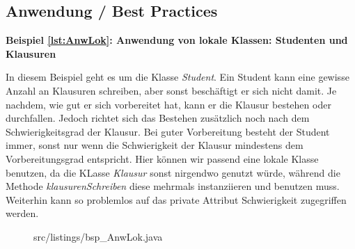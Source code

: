 \subsection{Anwendung / Best Practices}

{\bf Beispiel \ref{lst:AnwLok}: Anwendung von lokale Klassen: Studenten und Klausuren}

In diesem Beispiel geht es um die Klasse {\it Student}.
Ein Student kann eine gewisse Anzahl an Klausuren schreiben, aber sonst beschäftigt er sich nicht damit.
Je nachdem, wie gut er sich vorbereitet hat, kann er die Klausur bestehen oder durchfallen.
Jedoch richtet sich das Bestehen zusätzlich noch nach dem Schwierigkeitsgrad der Klausur.
Bei guter Vorbereitung besteht der Student immer, sonst nur wenn die  Schwierigkeit der Klausur mindestens dem Vorbereitungsgrad entspricht.
Hier können wir passend eine lokale Klasse benutzen, da die KLasse {\it Klausur} sonst nirgendwo genutzt würde, während die Methode {\it klausurenSchreiben} diese mehrmals instanziieren und benutzen muss.
Weiterhin kann so problemlos auf das private Attribut Schwierigkeit zugegriffen werden.
\\
\newpage
\begin{figure}[H]
\lstset{language=Java}
 {src/listings/bsp_AnwLok.java}
\end{figure}
\newpage
